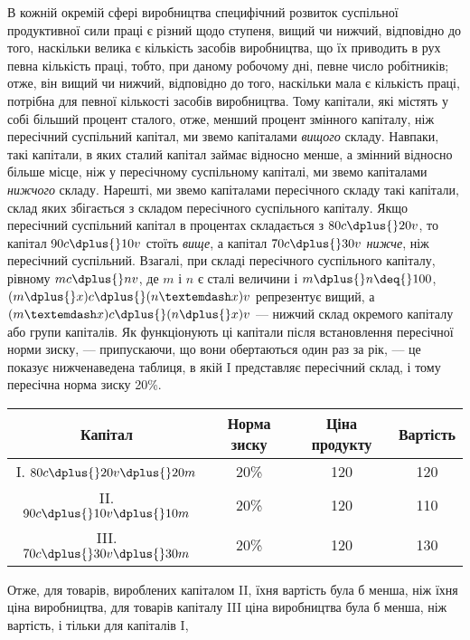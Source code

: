 В кожній окремій сфері виробництва специфічний розвиток
суспільної продуктивної сили праці є різний щодо ступеня,
вищий чи нижчий, відповідно до того, наскільки велика є кількість засобів виробництва, що їх
приводить в рух певна кількість праці, тобто, при даному робочому дні, певне число робітників; отже,
він вищий чи нижчий, відповідно до того, наскільки
мала є кількість праці, потрібна для певної кількості засобів
виробництва. Тому капітали, які містять у собі більший процент
сталого, отже, менший процент змінного капіталу, ніж пересічний суспільний капітал, ми звемо
капіталами \emph{вищого} складу.
Навпаки, такі капітали, в яких сталий капітал займає відносно
менше, а змінний відносно більше місце, ніж у пересічному
суспільному капіталі, ми звемо капіталами \emph{нижчого} складу.
Нарешті, ми звемо капіталами пересічного складу такі капітали,
склад яких збігається з складом пересічного суспільного капіталу. Якщо пересічний суспільний капітал
в процентах складається з $80 c \dplus{} 20 v$, то капітал $90 c \dplus{} 10 v$ стоїть \emph{вище}, а капітал $70 c \dplus{} 30 v$
\emph{нижче}, ніж пересічний суспільний. Взагалі, при
складі пересічного суспільного капіталу, рівному $mc \dplus{} nv$, де
$m$ і $n$ є сталі величини і $m \dplus{} n \deq{} 100$, $(m \dplus{} x) c \dplus{} (n — x) v$ репрезентує вищий, а $(m — x) c \dplus{} (n \dplus{} x)
v$ — нижчий склад окремого капіталу або групи капіталів. Як функціонують ці капітали після
встановлення пересічної норми зиску, — припускаючи, що
вони обертаються один раз за рік, — це показує нижченаведена
таблиця, в якій I представляє пересічний склад, і тому пересічна норма зиску \deq{} 20\%.

\begin{table}[H]
\centering
\begin{tabular}{c c c c}

\toprule
Капітал & Норма зиску & Ціна продукту & Вартість \\
\midrule

\phantom{II}I. $80 c \dplus{} 20 v \dplus{} 20 m$ & 20\% & 120 &  120 \\
\phantom{I}II.    $90 c \dplus{} 10 v \dplus{} 10 m$ & 20\% & 120 & 110\\
III. $70 c \dplus{} 30 v \dplus{} 30 m$ & 20\% & 120 & 130 \\

\end{tabular}
\end{table}

\noindent{}Отже, для товарів, вироблених капіталом II, їхня вартість була б
менша, ніж їхня ціна виробництва, для товарів капіталу III ціна
виробництва була б менша, ніж вартість, і тільки для капіталів I,
\parbreak{}  %

